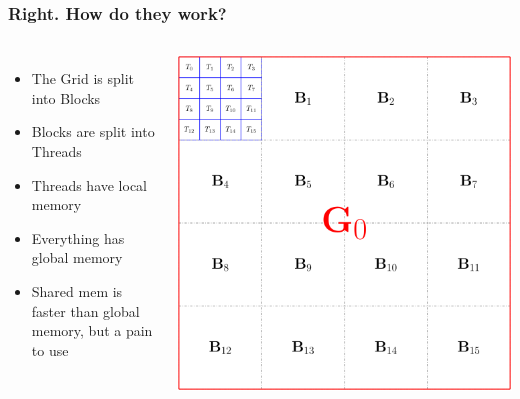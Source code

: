 \documentclass{beamer}
\begin{document}
\begin{frame}
\frametitle{Right. How do they work?}
\begin{columns}
\begin{itemize}
\item The Grid is split into Blocks
\item Blocks are split into Threads
\item Threads have local memory
\item Everything has global memory
\item Shared mem is faster than global memory, but a pain to use
\end{itemize}
\begin{center}

\includegraphics[width=\textwidth]{gputhreads.png}
\end{center}
\end{columns}
\end{frame}
\end{document}
